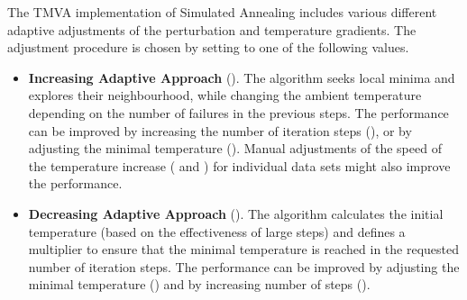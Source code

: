 The TMVA implementation of Simulated Annealing includes various different adaptive 
adjustments of the perturbation and temperature gradients. The adjustment procedure 
is chosen by setting  to one of the following values.
\begin{itemize}

\item {\sf\bfseries\small Increasing Adaptive Approach } (). 
      The algorithm seeks local minima and explores their neighbourhood, while                
      changing the ambient temperature depending on the number of failures            
      in the previous steps. The performance can be improved by increasing            
      the number of iteration steps (), or by adjusting the               
      minimal temperature (). Manual adjustments of the             
      speed of the temperature increase ( and )  
      for individual data sets might also improve the performance. 


\item {\sf\bfseries\small Decreasing Adaptive Approach} (). 
      The algorithm calculates the initial temperature (based on the effectiveness 
      of large steps) and defines a multiplier to ensure that the minimal temperature is reached  
      in the requested number of iteration steps. The performance can be improved 
      by adjusting the minimal temperature () and by increasing 
      number of steps ().


\end{itemize}
